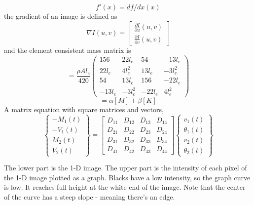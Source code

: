 \documentclass[BTech]{srmuthesis}
\begin{document}
\begin{equation}
f'(x)=df/dx(x) 
\label{eq:mkceqn}
\end{equation}  
the gradient of an image is defined as
\begin{equation}
\nabla I(u,v)=\begin{bmatrix}
\frac{\partial I}{\partial u}(u,v) \\
\frac{\partial I}{\partial v}(u,v)
\end{bmatrix}
\label{eq:sm}
\end{equation}
and the element consistent mass matrix is
\begin{equation}
[M^e]=\frac{\rho Al_e}{420}\begin{pmatrix}
156&22l_e &54&-13l_e\\
22l_e&4l_e^2&13l_e&-3l_e^2\\
54&13l_e&156&-22l_e\\
-13l_e&-3l_e^2&-22l_e&4l_e^2
\end{pmatrix}
\label{eq:cmm}
\end{equation}
\begin{equation}
[C]=\alpha[M]+\beta[K]
\end{equation}
A matrix equation with square matrices and vectors,
\begin{equation}
\begin{Bmatrix}
-M_1(t)\\
-V_1(t)\\
M_2(t)\\
V_2(t)\end{Bmatrix}=\begin{bmatrix}
D_{11}&D_{12}&D_{13}&D_{14}\\
D_{21}&D_{22}&D_{23}&D_{24}\\
D_{31}&D_{32}&D_{33}&D_{34}\\
D_{41}&D_{42}&D_{43}&D_{44}\end{bmatrix}\begin{Bmatrix}
v_1(t)\\
\theta_1(t)\\
v_2(t)\\
\theta_2(t)\end{Bmatrix}
\label{eq:D}
\end{equation}

The lower part is the 1-D image. The upper part is the intensity of each pixel of the 1-D image plotted as a graph. Blacks have a low intensity, so the graph curve is low. It reaches full height at the white end of the image. Note that the center of the curve has a steep slope - meaning there's an edge.
\end{document}
